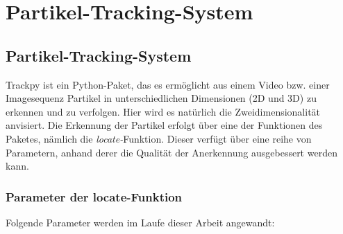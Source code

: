 \chapter{Partikel-Tracking-System}

\section{Partikel-Tracking-System}
Trackpy ist ein Python-Paket, das es ermöglicht aus einem Video bzw. einer Imagesequenz Partikel in unterschiedlichen Dimensionen (2D und 3D) zu erkennen und zu verfolgen. Hier wird es natürlich die Zweidimensionalität anvisiert. Die Erkennung der Partikel erfolgt über eine der Funktionen des Paketes, nämlich die \textit{locate-}Funktion.
Dieser verfügt über eine reihe von Parametern, anhand derer die Qualität der Anerkennung ausgebessert werden kann.

	\subsection{Parameter der locate-Funktion}
		Folgende Parameter werden im Laufe dieser Arbeit angewandt:


